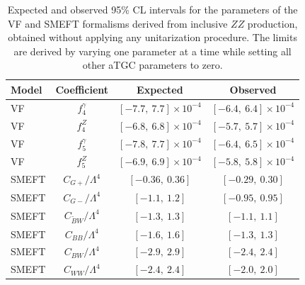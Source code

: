 \begin{table}[htbp]
\centering
\renewcommand{\arraystretch}{1.5}
\begin{tabular}{lccc}
\hline
\textbf{Model} & \textbf{Coefficient} & \textbf{Expected} & \textbf{Observed} \\
\hline
VF & $f_{4}^{\gamma}$ & $[-7.7,\ 7.7] \times 10^{-4}$ & $[-6.4,\ 6.4] \times 10^{-4}$ \\
VF & $f_{4}^{Z}$      & $[-6.8,\ 6.8] \times 10^{-4}$ & $[-5.7,\ 5.7] \times 10^{-4}$ \\
VF & $f_{5}^{\gamma}$ & $[-7.8,\ 7.7] \times 10^{-4}$ & $[-6.4,\ 6.5] \times 10^{-4}$ \\
VF & $f_{5}^{Z}$      & $[-6.9,\ 6.9] \times 10^{-4}$ & $[-5.8,\ 5.8] \times 10^{-4}$ \\
\hline
SMEFT &  $C_{G+}/\Lambda^4$         & $[-0.36,\ 0.36]$ & $[-0.29,\ 0.30]$ \\
SMEFT &  $C_{G-}/\Lambda^4$         & $[-1.1,\ 1.2]$   & $[-0.95,\ 0.95]$ \\
SMEFT & $C_{\tilde{B}W}/\Lambda^4$ & $[-1.3,\ 1.3]$   & $[-1.1,\ 1.1]$ \\
SMEFT &  $C_{BB}/\Lambda^4$         & $[-1.6,\ 1.6]$   & $[-1.3,\ 1.3]$ \\
SMEFT &  $C_{BW}/\Lambda^4$         & $[-2.9,\ 2.9]$   & $[-2.4,\ 2.4]$ \\
SMEFT & $C_{WW}/\Lambda^4$         & $[-2.4,\ 2.4]$   & $[-2.0,\ 2.0]$ \\
\hline
\end{tabular}
\caption{\rm Expected and observed 95\% CL intervals for the parameters of the VF and SMEFT formalisms derived from inclusive $ZZ$ production, obtained without applying any unitarization procedure. The limits are derived by varying one parameter at a time while setting all other aTGC parameters to zero.}
\label{tab:atgc_limits}
\end{table}


